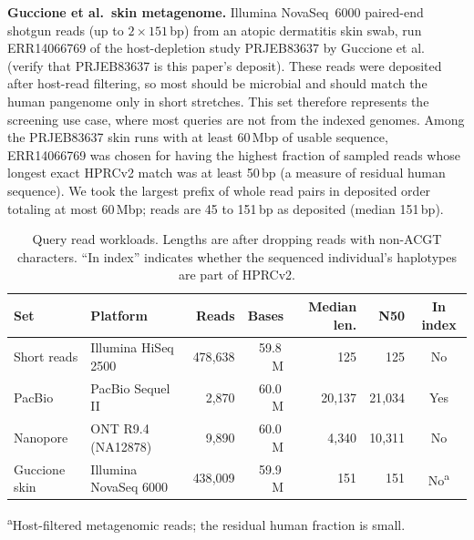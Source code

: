\textbf{Guccione et al.\ skin metagenome.}
Illumina NovaSeq~6000 paired-end shotgun reads (up to $2\times151$\,bp) from an atopic dermatitis skin swab, run ERR14066769 of the host-depletion study PRJEB83637 by Guccione et al.~\cite{guccione2025incomplete} (verify that PRJEB83637 is this paper's deposit).
These reads were deposited after host-read filtering, so most should be microbial and should match the human pangenome only in short stretches.
This set therefore represents the screening use case, where most queries are not from the indexed genomes.
Among the PRJEB83637 skin runs with at least 60\,Mbp of usable sequence, ERR14066769 was chosen for having the highest fraction of sampled reads whose longest exact HPRCv2 match was at least 50\,bp (a measure of residual human sequence).
We took the largest prefix of whole read pairs in deposited order totaling at most 60\,Mbp; reads are 45 to 151\,bp as deposited (median 151\,bp).

\begin{table}[t]
\centering
\caption{Query read workloads. Lengths are after dropping reads with non-ACGT characters. ``In index'' indicates whether the sequenced individual's haplotypes are part of HPRCv2.}
\label{tab:reads}
\begin{tabular}{llrrrrc}
\toprule
Set & Platform & Reads & Bases & Median len. & N50 & In index \\
\midrule
Short reads   & Illumina HiSeq 2500    & 478{,}638 & 59.8\,M & 125     & 125      & No  \\
PacBio        & PacBio Sequel II       &   2{,}870 & 60.0\,M & 20{,}137 & 21{,}034 & Yes \\
Nanopore      & ONT R9.4 (NA12878)     &   9{,}890 & 60.0\,M & 4{,}340  & 10{,}311 & No  \\
Guccione skin & Illumina NovaSeq 6000  & 438{,}009 & 59.9\,M & 151     & 151      & No\textsuperscript{a} \\
\bottomrule
\end{tabular}

\smallskip
{\footnotesize \textsuperscript{a}Host-filtered metagenomic reads; the residual human fraction is small.}
\end{table}

